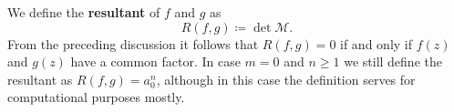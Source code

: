 We define the {\bf resultant} of $f$ and $g$ as 
\begin{equation}\label{defresultant}
R(f,g) \coloneqq \det \mathcal{M}.
\end{equation}
From the preceding discussion it follows that $R(f,g) = 0$ if and only if $f(z)$ and $g(z)$ have a common factor. In case $m=0$ and $n\geq 1$ we still define the resultant as $R(f,g) =a_0^{n}$, although in this case the definition serves for computational purposes mostly.\\

